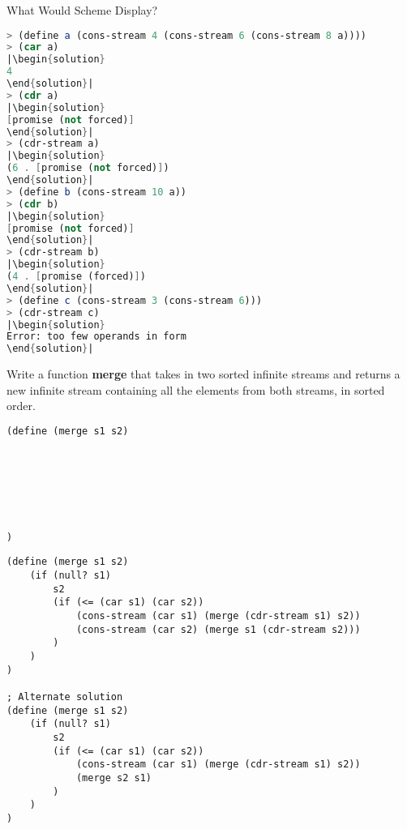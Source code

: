 \question
What Would Scheme Display?

\begin{lstlisting}[language=Scheme]
> (define a (cons-stream 4 (cons-stream 6 (cons-stream 8 a))))
> (car a)
|\begin{solution}
4
\end{solution}|
> (cdr a)
|\begin{solution}
[promise (not forced)]
\end{solution}|
> (cdr-stream a)
|\begin{solution}
(6 . [promise (not forced)])
\end{solution}|
> (define b (cons-stream 10 a))
> (cdr b)
|\begin{solution}
[promise (not forced)]
\end{solution}|
> (cdr-stream b)
|\begin{solution}
(4 . [promise (forced)])
\end{solution}|
> (define c (cons-stream 3 (cons-stream 6)))
> (cdr-stream c)
|\begin{solution}
Error: too few operands in form
\end{solution}|
\end{lstlisting}

\question
Write a function \textbf{merge} that takes in two sorted infinite streams and returns a new infinite stream containing all the elements from both streams, in sorted order. 

\begin{lstlisting}[language=Scheme]
(define (merge s1 s2)







)
\end{lstlisting}

\begin{solution}
\begin{verbatim}
(define (merge s1 s2)
	(if (null? s1)
		s2
		(if (<= (car s1) (car s2))
			(cons-stream (car s1) (merge (cdr-stream s1) s2))
			(cons-stream (car s2) (merge s1 (cdr-stream s2)))
		)
	)
)
	
; Alternate solution
(define (merge s1 s2)
	(if (null? s1)
		s2
		(if (<= (car s1) (car s2))
			(cons-stream (car s1) (merge (cdr-stream s1) s2))
			(merge s2 s1)
		)
	)
)
\end{verbatim}
\end{solution}
